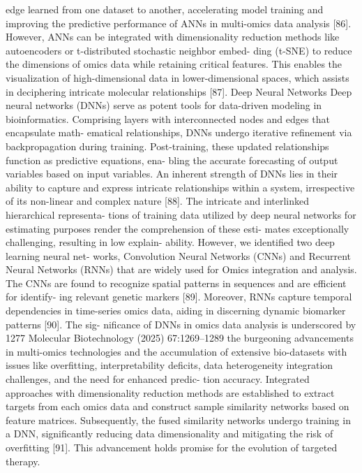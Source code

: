 edge learned from one dataset to another, accelerating model
training and improving the predictive performance of ANNs
in multi-omics data analysis [86]. However, ANNs can be
integrated with dimensionality reduction methods like
autoencoders or t-distributed stochastic neighbor embed-
ding (t-SNE) to reduce the dimensions of omics data while
retaining critical features. This enables the visualization of
high-dimensional data in lower-dimensional spaces, which
assists in deciphering intricate molecular relationships [87].
Deep Neural Networks
Deep neural networks (DNNs) serve as potent tools for
data-driven modeling in bioinformatics. Comprising layers
with interconnected nodes and edges that encapsulate math-
ematical relationships, DNNs undergo iterative refinement
via backpropagation during training. Post-training, these
updated relationships function as predictive equations, ena-
bling the accurate forecasting of output variables based on
input variables. An inherent strength of DNNs lies in their
ability to capture and express intricate relationships within
a system, irrespective of its non-linear and complex nature
[88]. The intricate and interlinked hierarchical representa-
tions of training data utilized by deep neural networks for
estimating purposes render the comprehension of these esti-
mates exceptionally challenging, resulting in low explain-
ability. However, we identified two deep learning neural net-
works, Convolution Neural Networks (CNNs) and Recurrent
Neural Networks (RNNs) that are widely used for Omics
integration and analysis. The CNNs are found to recognize
spatial patterns in sequences and are efficient for identify-
ing relevant genetic markers [89]. Moreover, RNNs capture
temporal dependencies in time-series omics data, aiding
in discerning dynamic biomarker patterns [90]. The sig-
nificance of DNNs in omics data analysis is underscored by
1277
Molecular Biotechnology (2025) 67:1269–1289
the burgeoning advancements in multi-omics technologies
and the accumulation of extensive bio-datasets with issues
like overfitting, interpretability deficits, data heterogeneity
integration challenges, and the need for enhanced predic-
tion accuracy. Integrated approaches with dimensionality
reduction methods are established to extract targets from
each omics data and construct sample similarity networks
based on feature matrices. Subsequently, the fused similarity
networks undergo training in a DNN, significantly reducing
data dimensionality and mitigating the risk of overfitting
[91]. This advancement holds promise for the evolution of
targeted therapy.
